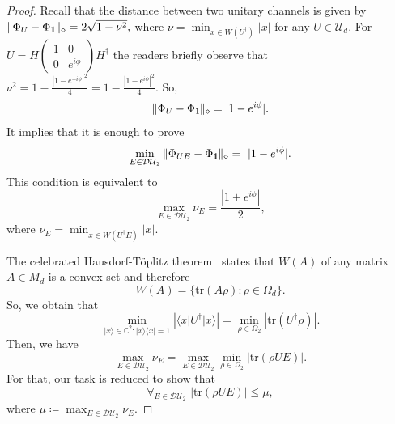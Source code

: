 \documentclass[preprint,12pt, a4paper]{elsarticle}
\newcommand{\ket}[1]{\ensuremath{|#1\rangle}}
\newcommand{\bra}[1]{\ensuremath{\langle#1|}}
\newcommand{\ketbra}[2]{\ensuremath{\ket{#1}\bra{#2}}}
\newcommand{\proj}[1]{\ensuremath{\ketbra{#1}{#1}}}
\newcommand{\1}{{\rm 1\hspace{-0.9mm}l}}
\newcommand{\Id}{{\rm 1\hspace{-0.9mm}l}}
\newcommand{\diaguni}{\ensuremath{\mathcal{DU}}}
\newcommand{\tr}{\mathrm{tr}}
\begin{document}
\begin{proof} Recall that the distance between two unitary channels is given by
	$
	\| \Phi_U  - \Phi_{\1} \|_\diamond = 2 \sqrt{1-\nu^2},
	$
	where $\nu = \min_{x \in W(U^\dagger)} |x|  $ for any $U \in \mathcal{U}_d$. 
	For $U = H 
	\left(\begin{array}{cc}1&0\\0&e^{i \phi}\end{array}\right)  H^\dagger$ the readers briefly observe that  $\nu^2 = 1 - \frac{|1 - e^{-i \phi} |^2 }{4} = 1 - \frac{|1 - e^{i \phi} |^2 }{4}$. So, 
	\begin{equation}
	\|  \Phi_U  - \Phi_{\1} \|_\diamond = | 1 - e^{i \phi} |. 
	\end{equation} 
	It implies that it is enough to prove  \begin{equation}
	\min_{E \in \diaguni_2} \|\Phi_{UE} - 
	\Phi_\Id\|_\diamond  = | 1 - e^{i \phi} |.
	\end{equation}
	This condition is equivalent to 
	\begin{equation}
	\max_{E \in \diaguni_2 } \nu_{E} = \frac{|1 + e^{i \phi} | }{2},
	\end{equation}
	where $\nu_E = \min_{x \in W(U^\dagger E)} |x|. $ 
	
	The celebrated Hausdorf-T{\"o}plitz theorem~\cite{hausdorff, toeplitz} states that
	$W(A)$ of any matrix $A \in M_d$ is a convex set and therefore
	\begin{equation}
	W(A) = \{ \tr(A \rho): \rho \in \Omega_d\}. 
	\end{equation}
	So, we obtain that 
	\begin{equation}
	\min_{\ket{x} \in \mathbb{C}^2:   \proj{x} = 1} |\bra{x}U^\dagger\ket{x}| = 
	\min_{\rho \in \Omega_2} |\tr(U^\dagger\rho)|. 
	\end{equation}
	Then, we have 
	\begin{equation}
	\max_{E \in \diaguni_2 } \nu_{E}  = \max_{E \in \diaguni_2 }  \min_{\rho \in 
		\Omega_2} \left| \tr \left( \rho U E \right) \right|.
	\end{equation}
	For that, our task is reduced to show that
	\begin{equation}
	\forall_{E \in \diaguni_2} \,\, | \tr \left(\rho U E\right) | \le \mu,
	\end{equation}
	where $\mu \coloneqq \max_{E \in \diaguni_2 } \nu_{E}.$
	

\end{proof}
\end{document}
